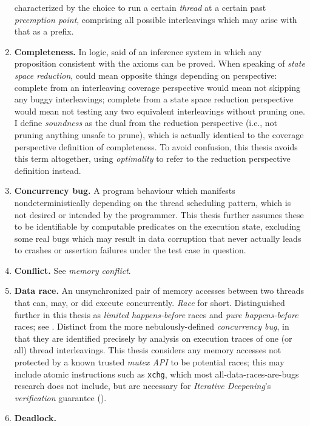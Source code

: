 \begin{enumerate}
		characterized by the choice to run a certain {\em thread} at a certain past {\em preemption point},
		comprising all possible interleavings which may arise with that as a prefix.
	\item {\bf Completeness.}
		In logic, said of an inference system in which any proposition consistent with the axioms can be proved.
		When speaking of {\em state space reduction},
		could mean opposite things depending on perspective:
		complete from an interleaving coverage perspective would mean not skipping any buggy interleavings;
		complete from a state space reduction perspective would mean not testing any two equivalent interleavings
		without pruning one.
		I define {\em soundness} as the dual from the reduction perspective (i.e., not pruning anything unsafe to prune),
		which is actually identical to the coverage perspective definition of completeness.
		To avoid confusion, this thesis avoids this term altogether,
		using {\em optimality} to refer to the reduction perspective definition instead.
	\item {\bf Concurrency bug.}
		A program behaviour which manifests nondeterministically depending on the thread scheduling pattern,
		which is not desired or intended by the programmer.
		This thesis further assumes these to be identifiable by computable predicates on the execution state,
		excluding some real bugs which may result in data corruption that never actually leads to crashes or assertion
		failures under the test case in question.
	\item {\bf Conflict.} See {\em memory conflict}.
	\item {\bf Data race.}
		An unsynchronized pair of memory accesses between two threads that can, may, or did execute concurrently.
		{\em Race} for short.
		Distinguished further in this thesis as {\em limited happens-before} races and {\em pure happens-before} races;
		see \sect{\ref{sec:background-datarace}}.
		Distinct from the more nebulously-defined {\em concurrency bug},
		in that they are identified precisely by analysis on execution traces of one (or all) thread interleavings.
		This thesis considers any memory accesses not protected by a known trusted {\em mutex API}
		to be potential races;
		this may include atomic instructions such as {\tt xchg},
		which most all-data-races-are-bugs research does not include,
		but are necessary for {\em Iterative Deepening}'s {\em verification} guarantee
		(\sect{\ref{sec:quicksand-soundness}}).
	\item {\bf Deadlock.}

\end{enumerate}

